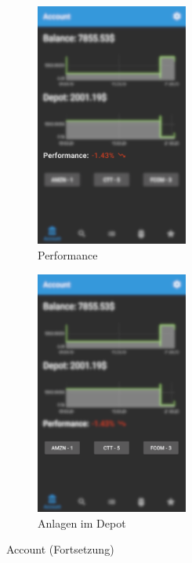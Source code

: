 \documentclass[a4paper]{article}
\begin{document}
\begin{figure}[H]
    \ContinuedFloat
    \begin{subfigure}{.5\textwidth}
        \centering
        \includegraphics[height=8cm,keepaspectratio]{./images/account/performance.png}
        \caption{Performance}
        \label{fig:functionality:account:performance}
    \end{subfigure}
    \begin{subfigure}{.5\textwidth}
        \centering
        \includegraphics[height=8cm,keepaspectratio]{./images/account/depot_quotes.png}
        \caption{Anlagen im Depot}
        \label{fig:functionality:account:depot_quotes}
    \end{subfigure}
    \caption{Account (Fortsetzung)}
\end{figure}

\end{document}
